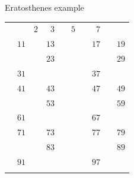 \documentclass{beamer}
\begin{document}
\begin{frame}[plain]{Eratosthenes example}
{\begin{tabular}{r r r r r r r r r r}
			                   &                    & \color{black}  $2$ & \color{black}  $3$ &                    & \color{ blue}  $5$ &                    & \color{black}  $7$ &                    &                   \\
			                   & \color{black} $11$ &                    & \color{black} $13$ &                    &                    &                    & \color{black} $17$ &                    & \color{black} $19$\\
			                   &                    &                    & \color{black} $23$ &                    &                    &                    &                    &                    & \color{black} $29$\\
			                   & \color{black} $31$ &                    &                    &                    &                    &                    & \color{black} $37$ &                    &                   \\
			                   & \color{black} $41$ &                    & \color{black} $43$ &                    &                    &                    & \color{black} $47$ &                    & \color{black} $49$\\
			                   &                    &                    & \color{black} $53$ &                    &                    &                    &                    &                    & \color{black} $59$\\
			                   & \color{black} $61$ &                    &                    &                    &                    &                    & \color{black} $67$ &                    &                   \\
			                   & \color{black} $71$ &                    & \color{black} $73$ &                    &                    &                    & \color{black} $77$ &                    & \color{black} $79$\\
			                   &                    &                    & \color{black} $83$ &                    &                    &                    &                    &                    & \color{black} $89$\\
			                   & \color{black} $91$ &                    &                    &                    &                    &                    & \color{black} $97$ &                    &                   \\
			\phantom{$888$} & \phantom{$888$} & \phantom{$888$} & \phantom{$888$} & \phantom{$888$} & \phantom{$888$} & \phantom{$888$} & \phantom{$888$} & \phantom{$888$} & \phantom{$888$}

\end{tabular}}
\end{frame}
\end{document}
